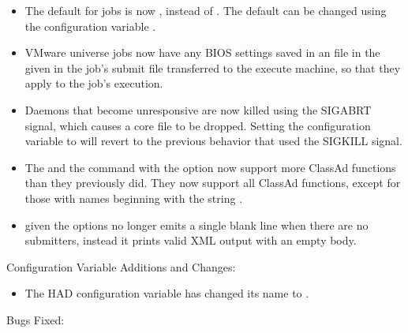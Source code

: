 \begin{itemize}

\item The default  for jobs is now 
, instead of .
The default can be changed using the configuration variable
.

\item VMware  universe jobs now have any BIOS settings saved in
an  file in the  given in the
job's submit file transferred to the execute machine, so that they
apply to the job's execution.

\item Daemons that become unresponsive are now killed using the
SIGABRT signal, which causes a core file to be dropped.
Setting the configuration variable 
to  will revert to the previous behavior that used
the SIGKILL signal.

\item The  and the
 command with the  option now
support more ClassAd functions than they previously did.  They now
support all ClassAd functions, except for those with names beginning
with the string .

\item {} given the options  
no longer emits a single blank line when there are no submitters,
instead it prints valid XML output with an empty body.

\end{itemize}

\noindent Configuration Variable Additions and Changes:

\begin{itemize}

\item The HAD configuration variable 
has changed its name to .

\end{itemize}

\noindent Bugs Fixed:

